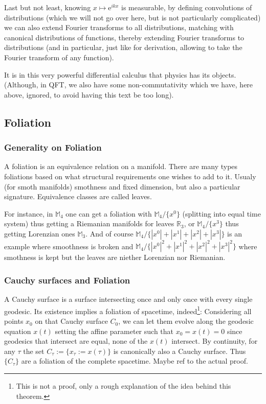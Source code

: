 \documentclass[a4paper,11pt]{article}
\numberwithin{equation}{section}
\theoremstyle{definition}
\newcommand{\e}{{\mathrm{e}}}
\begin{document}
    Last but not least, knowing $x\mapsto \e^{ikx}$ is measurable, by defining convolutions of distributions (which we will not go over here, but is not particularly complicated) we can also extend Fourier transforms to all distributions, matching with canonical distributions of functions, thereby extending Fourier transforms to distributions (and in particular, just like for derivation, allowing to take the Fourier transform of any function).

    It is in this very powerful differential calculus that physics has its objects. (Although, in QFT, we also have some non-commutativity which we have, here above, ignored, to avoid having this text be too long).
\subsection{Foliation}\label{MatFoli}
\subsubsection{Generality on Foliation}
A foliation is an equivalence relation on a manifold. There are many types foliations based on what structural requirements one wishes to add to it. Usualy (for smoth manifolds) smothness and fixed dimension, but also a particular signature. Equivalence classes are called leaves.

For instance, in $\mathbb{M}_4$ one can get a foliation with $\mathbb{M}_4/\{x^0\}$ (splitting into equal time system) thus getting a Riemanian manifolds for leaves $\mathbb{R}_3$, or $\mathbb{M}_4/\{x^3\}$ thus getting Lorenzian ones $\mathbb{M}_3$. And of course $\mathbb{M}_4/\{|x^0|+|x^1|+|x^2|+|x^3|\}$ is an example where smoothness is broken and $\mathbb{M}_4/\{|x^0|^2+|x^1|^2+|x^2|^2+|x^3|^2\}$ where smothness is kept but the leaves are niether Lorenzian nor Riemanian.

\subsubsection{Cauchy surfaces and Foliation}\label{CauchyMat}
A Cauchy surface is a surface intersecting once and only once with every single geodesic. Its existence implies a foliation of spacetime, indeed\footnote{This is not a proof, only a rough explanation of the idea behind this theorem.}:
Considering all points $x_0$ on that Cauchy surface $C_0$, we can let them evolve along the geodesic equation $x(t)$ setting the affine parameter such that $x_0=x(t)=0$ since geodesics that intersect are equal, none of the $x(t)$ intersect. By continuity, for any $\tau$ the set $C_\tau := \{x_\tau := x(\tau)\}$ is canonically also a Cauchy surface. Thus $\{C_\tau\}$ are a foliation of the complete spacetime. \color{red} Maybe ref to the actual proof.\color{black}
\end{document}
